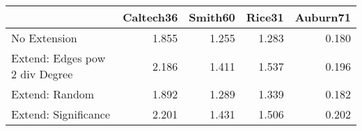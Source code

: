 \begin{tabular}{lrrrr}
\toprule
{} & Caltech36 & Smith60 & Rice31 & Auburn71 \\
\midrule
No Extension                   &     1.855 &   1.255 &  1.283 &    0.180 \\
Extend: Edges pow 2 div Degree &     2.186 &   1.411 &  1.537 &    0.196 \\
Extend: Random                 &     1.892 &   1.289 &  1.339 &    0.182 \\
Extend: Significance           &     2.201 &   1.431 &  1.506 &    0.202 \\
\bottomrule
\end{tabular}
